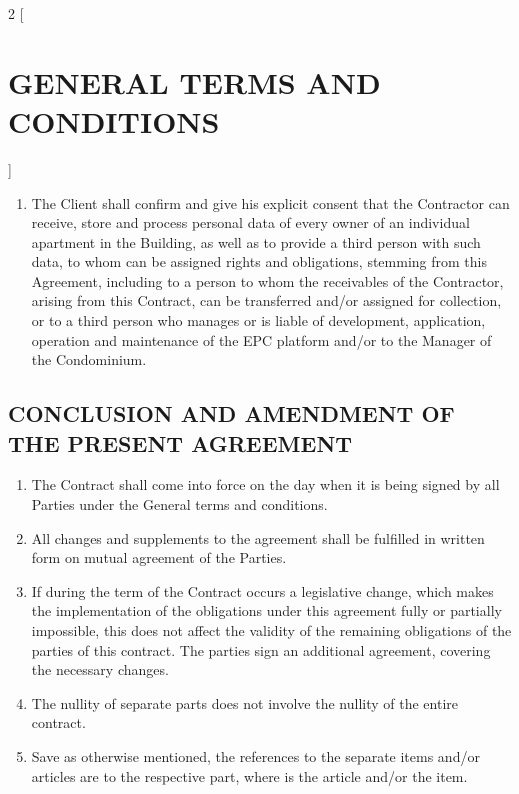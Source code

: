 \begin{multicols}{2} [\section{GENERAL TERMS AND CONDITIONS}]
\begin{enumerate}
      platform.
    \item The Client shall confirm and give his explicit consent that
      the Contractor can receive, store and process personal data of
      every owner of an individual apartment in the Building, as well
      as to provide a third person with such data, to whom can be
      assigned rights and obligations, stemming from this Agreement,
      including to a person to whom the receivables of the Contractor,
      arising from this Contract, can be transferred and/or assigned
      for collection, or to a third person who manages or is liable of
      development, application, operation and maintenance of the EPC
      platform and/or to the Manager of the Condominium.
    \end{enumerate}

    \subsection{CONCLUSION AND AMENDMENT OF THE PRESENT AGREEMENT}
    \begin{enumerate}
    \item The Contract shall come into force on the day when it is
      being signed by all Parties under the General terms and
      conditions.
    \item All changes and supplements to the agreement shall be
      fulfilled in written form on mutual agreement of the Parties.
    \item If during the term of the Contract occurs a legislative
      change, which makes the implementation of the obligations under
      this agreement fully or partially impossible, this does not
      affect the validity of the remaining obligations of the parties
      of this contract. The parties sign an additional agreement,
      covering the necessary changes.
    \item The nullity of separate parts does not involve the nullity
      of the entire contract.
    \item Save as otherwise mentioned, the references to the separate
      items and/or articles are to the respective part, where is the
      article and/or the item.
    \end{enumerate}


\end{multicols}
